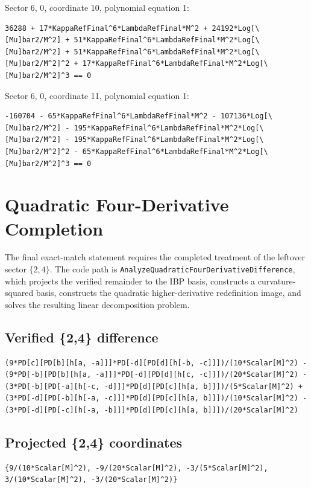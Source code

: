 \documentclass[11pt]{article}
\begin{document}
Sector {6, 0}, coordinate 10, polynomial equation 1:
\begin{verbatim}
36288 + 17*KappaRefFinal^6*LambdaRefFinal*M^2 + 24192*Log[\[Mu]bar2/M^2] + 51*KappaRefFinal^6*LambdaRefFinal*M^2*Log[\[Mu]bar2/M^2] + 51*KappaRefFinal^6*LambdaRefFinal*M^2*Log[\[Mu]bar2/M^2]^2 + 17*KappaRefFinal^6*LambdaRefFinal*M^2*Log[\[Mu]bar2/M^2]^3 == 0
\end{verbatim}

Sector {6, 0}, coordinate 11, polynomial equation 1:
\begin{verbatim}
-160704 - 65*KappaRefFinal^6*LambdaRefFinal*M^2 - 107136*Log[\[Mu]bar2/M^2] - 195*KappaRefFinal^6*LambdaRefFinal*M^2*Log[\[Mu]bar2/M^2] - 195*KappaRefFinal^6*LambdaRefFinal*M^2*Log[\[Mu]bar2/M^2]^2 - 65*KappaRefFinal^6*LambdaRefFinal*M^2*Log[\[Mu]bar2/M^2]^3 == 0
\end{verbatim}

\section{Quadratic Four-Derivative Completion}
The final exact-match statement requires the completed treatment of the leftover sector $\{2,4\}$. The code path is \texttt{AnalyzeQuadraticFourDerivativeDifference}, which projects the verified remainder to the IBP basis, constructs a curvature-squared basis, constructs the quadratic higher-derivative redefinition image, and solves the resulting linear decomposition problem.
\subsection{Verified \{2,4\} difference}
\begin{verbatim}
(9*PD[c][PD[b][h[a, -a]]]*PD[-d][PD[d][h[-b, -c]]])/(10*Scalar[M]^2) - (9*PD[-b][PD[b][h[a, -a]]]*PD[-d][PD[d][h[c, -c]]])/(20*Scalar[M]^2) - (3*PD[-b][PD[-a][h[-c, -d]]]*PD[d][PD[c][h[a, b]]])/(5*Scalar[M]^2) + (3*PD[-d][PD[-b][h[-a, -c]]]*PD[d][PD[c][h[a, b]]])/(10*Scalar[M]^2) - (3*PD[-d][PD[-c][h[-a, -b]]]*PD[d][PD[c][h[a, b]]])/(20*Scalar[M]^2)
\end{verbatim}
\subsection{Projected \{2,4\} coordinates}
\begin{verbatim}
{9/(10*Scalar[M]^2), -9/(20*Scalar[M]^2), -3/(5*Scalar[M]^2), 3/(10*Scalar[M]^2), -3/(20*Scalar[M]^2)}
\end{verbatim}
\end{document}

